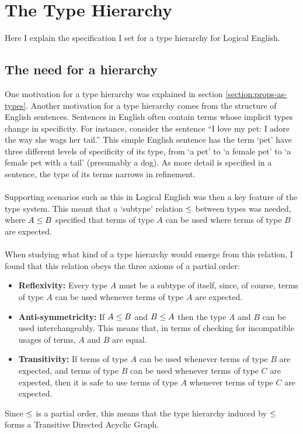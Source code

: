 \documentclass[../main.tex]{subfiles}
\begin{document}

\section{The Type Hierarchy}
Here I explain the specification I set for a type hierarchy for Logical English.

\subsection{The need for a hierarchy}
One motivation for a type hierarchy was explained in section \ref{section:props-as-types}. Another motivation for a type hierarchy comes from the structure of English sentences. Sentences in English often contain terms whose implicit types change in specificity. 
For instance, consider the sentence ``I love my pet: I adore the way she wags her tail.'' This simple English sentence has the term `pet' have three different levels of specificity of its type, from `a pet' to `a female pet' to `a female pet with a tail' (presumably a dog). As more detail is specified in a sentence, the type of its terms narrows in refinement. 
\\
\\
Supporting scenarios such as this in Logical English was then a key feature of the type system. This meant that a `subtype' relation $\leq$ between types was needed, where $A \leq B$ specified that terms of type $A$ can be used where terms of type $B$ are expected. 
\\
\\
When studying what kind of a type hierarchy would emerge from this relation, I found that this relation obeys the three axioms of a partial order:
\begin{itemize}
    \item \textbf{Reflexivity:} Every type $A$ must be a subtype of itself, since, of course, terms of type $A$ can be used whenever terms of type $A$ are expected.
    \item \textbf{Anti-symmetricity:} If $A \leq B$ and $B \leq A$ then the type $A$ and $B$ can be used interchangeably. This means that, in terms of checking for incompatible usages of terms, $A$ and $B$ are equal. 
    \item \textbf{Transitivity:} If terms of type $A$ can be used whenever terms of type $B$ are expected, and terms of type $B$ can be used whenever terms of type $C$ are expected, then it is safe to use terms of type $A$ whenever terms of type $C$ are expected.
\end{itemize}
Since $\leq$ is a partial order, this means that the type hierarchy induced by $\leq$ forms a Transitive Directed Acyclic Graph.
\end{document}
